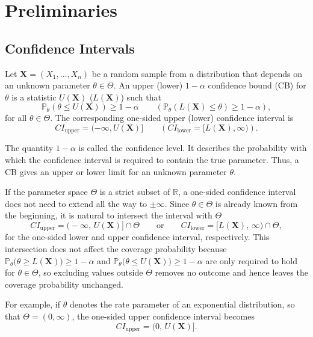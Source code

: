\chapter{Preliminaries}

\section{Confidence Intervals}


\begin{definition}
	Let $\mathbf X = (X_1, \ldots, X_n)$ be a random sample from a distribution that depends on an unknown parameter $\theta \in \Theta$.
	An upper (lower) $1-\alpha$ confidence bound (CB) for $\theta$ is a statistic $U(\mathbf X)$ ($L(\mathbf X)$) such that
	\[
	\mathbb{P}_\theta\left(\theta \leq U(\mathbf X)\right) \geq 1-\alpha
	\qquad
	\left(
	\mathbb{P}_\theta\left(L(\mathbf X) \leq \theta\right) \geq 1-\alpha
	\right),
	\]
	for all $\theta \in \Theta$.
	The corresponding one-sided upper (lower) confidence interval is
	\[
	CI_{\text{upper}} = (-\infty, U(\mathbf X)]
	\qquad
	\left(
	CI_{\text{lower}} = [L(\mathbf X), \infty)
	\right).
	\]
\end{definition}


The quantity $1-\alpha$ is called the confidence level. It describes the probability with which the confidence interval is required to contain the true parameter.
Thus, a CB gives an upper or lower limit for an unknown parameter $\theta$.


If the parameter space $\Theta$ is a strict subset of $\mathbb{R}$, a one-sided confidence interval does not need to extend all the way to $\pm\infty$. Since $\theta \in \Theta$ is already known from the beginning, it is natural to intersect the interval with $\Theta$
\[
CI_{\text{upper}} = \big( -\infty,\, U(\mathbf X) \big] \cap \Theta
\qquad \text{or} \qquad
CI_{\text{lower}} = \big[ L(\mathbf X),\, \infty \big) \cap \Theta,
\]
for the one-sided lower and upper confidence interval, respectively. This intersection does not affect the coverage probability because $\mathbb{P}_\theta\big(\theta \ge L(\mathbf X)\big) \ge 1-\alpha$ and $\mathbb{P}_\theta\big(\theta \le U(\mathbf X)\big) \ge 1-\alpha$ are only required to hold for $\theta \in \Theta$, so excluding values outside $\Theta$ removes no outcome and hence leaves the coverage probability unchanged.

For example, if $\theta$ denotes the rate parameter of an exponential distribution, so that $\Theta = (0, \infty)$, the one-sided upper confidence interval becomes
\[
	CI_{\text{upper}} = \big( 0,\, U(\mathbf X) \big].
\]

